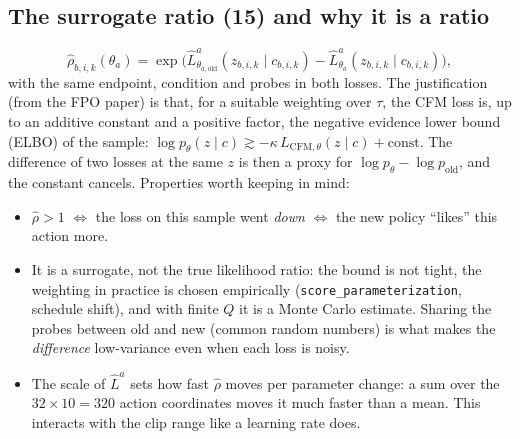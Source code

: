 \documentclass[11pt,a4paper]{article}
\newcommand{\tha}{\theta_a}
\newcommand{\thao}{\theta_{a,\mathrm{old}}}
\newcommand{\Lh}{\hat L^{a}}
\newcommand{\eqp}[1]{\textup{(#1)}} %
\theoremstyle{remark}
\begin{document}
\subsection{The surrogate ratio \eqp{15} and why it is a ratio}
\begin{equation}
\hat\rho_{b,i,k}(\tha)=\exp\!\big(\Lh_{\thao}(z_{b,i,k}\mid c_{b,i,k})-\Lh_{\tha}(z_{b,i,k}\mid c_{b,i,k})\big),
\label{eq:ratio}
\end{equation}
with the same endpoint, condition and probes in both losses. The justification (from the FPO paper) is that, for a suitable weighting over $\tau$, the CFM loss is, up to an additive constant and a positive factor, the negative evidence lower bound (ELBO) of the sample: $\log p_\theta(z\mid c)\gtrsim-\kappa\,L_{\mathrm{CFM},\theta}(z\mid c)+\text{const}$. The difference of two losses at the same $z$ is then a proxy for $\log p_\theta-\log p_{\mathrm{old}}$, and the constant cancels. Properties worth keeping in mind:
\begin{itemize}
\item $\hat\rho>1$ $\Leftrightarrow$ the loss on this sample went \emph{down} $\Leftrightarrow$ the new policy ``likes'' this action more.
\item It is a surrogate, not the true likelihood ratio: the bound is not tight, the weighting in practice is chosen empirically (\texttt{score\_parameterization}, schedule shift), and with finite $Q$ it is a Monte Carlo estimate. Sharing the probes between old and new (common random numbers) is what makes the \emph{difference} low-variance even when each loss is noisy.
\item The scale of $\Lh$ sets how fast $\hat\rho$ moves per parameter change: a sum over the $32\times10=320$ action coordinates moves it much faster than a mean. This interacts with the clip range like a learning rate does.
\end{itemize}
\end{document}
